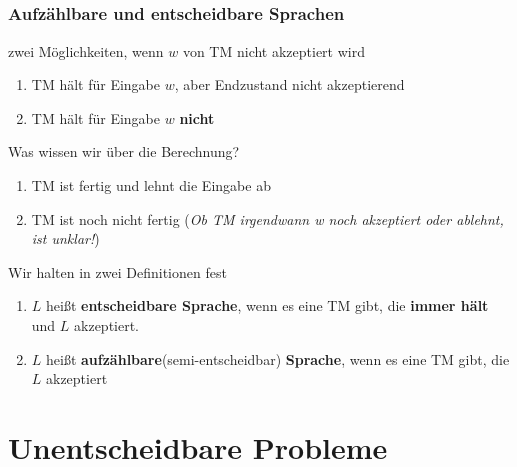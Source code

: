 \subsection*{}
\begin{frame}
  \frametitle{Aufzählbare und entscheidbare Sprachen}
  \begin{block}{zwei Möglichkeiten, wenn $w$ von TM nicht akzeptiert wird}
\begin{enumerate}
\pause
	\item TM hält für Eingabe $w$, aber Endzustand nicht akzeptierend
	\pause
  \item	TM hält für Eingabe $w$ \textbf{nicht}
\end{enumerate}
\end{block}
\pause
  \begin{block}{Was wissen wir über die Berechnung?}
\begin{enumerate}
\pause
	\item TM ist fertig und lehnt die Eingabe ab
\pause
  \item	TM ist noch nicht fertig (\textit{Ob TM irgendwann w noch akzeptiert oder ablehnt, ist unklar!})
\end{enumerate}
\end{block}
\pause
  \begin{block}{Wir halten in zwei Definitionen fest}
\begin{enumerate}
	\item $L$ heißt \textbf{entscheidbare Sprache}, wenn es eine TM gibt, die \textbf{immer hält} und $L$ akzeptiert.
	\pause
	\item $L$ heißt \textbf{aufzählbare}(semi-entscheidbar) \textbf{Sprache}, wenn es eine TM gibt, die $L$ akzeptiert
\end{enumerate}
\end{block}
\end{frame}

\section{Unentscheidbare Probleme}


